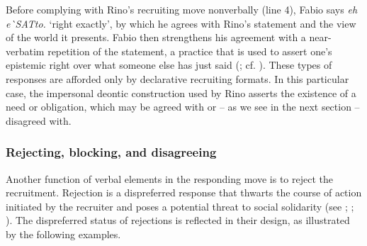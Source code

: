 \documentclass[output=paper,modfonts]{langscibook}
\begin{document}
Before complying with Rino's recruiting move nonverbally (line 4), Fabio says \textit{eh e\`{}SATto.} ‘right exactly’, by which he agrees with Rino's statement and the view of the world it presents. Fabio then strengthens his agreement with a near-verbatim repetition of the statement, a practice that is used to assert one's epistemic right over what someone else has just said (\citealt{Stivers2005}; cf. \citealt{Schegloff1996}). These types of responses are afforded only by declarative recruiting formats. In this particular case, the impersonal deontic construction used by Rino asserts the existence of a need or obligation, which may be agreed with or -- as we see in the next section -- disagreed with. 

\subsubsection{Rejecting, blocking, and disagreeing}\label{sec:rossi:4.2.2}

Another function of verbal elements in the responding move is to reject the recruitment. Rejection is a dispreferred response that thwarts the course of action initiated by the recruiter and poses a potential threat to social solidarity (see \citealt[265--80]{Heritage1984b}; \citealt{BrownLevinson1987}; \citealt[chap. 5]{Schegloff2007}). The dispreferred status of rejections is reflected in their design, as illustrated by the following examples.
\end{document}
